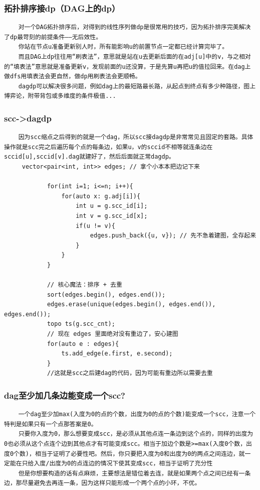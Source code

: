 \documentclass[10pt, a4paper, twocolumn]{article} %
\begin{document}
    \subsubsection{拓扑排序接dp（DAG上的dp）}
    \begin{lstlisting}
    对一个DAG拓扑排序后，对得到的线性序列做dp是很常用的技巧，因为拓扑排序完美解决了dp最苛刻的前提条件——无后效性。
    你站在节点u准备更新别人时，所有能影响u的前置节点一定都已经计算完毕了。
    而且DAG上dp往往用“刷表法”，意思就是站在u去更新后面的在adj[u]中的v，与之相对的“填表法”意思就是准备更新v，发现前面的u还没算，于是先算u再把u的值拉回来。在dag上做dfs用填表法会更自然，做dp用刷表法会更顺畅。
    dagdp可以解决很多问题，例如dag上的最短路最长路，从起点到终点有多少种路径，图上博弈论，附带背包或多维度的条件极值...
    \end{lstlisting}
    \subsubsection{scc->dagdp}
    \begin{lstlisting}
    因为scc缩点之后得到的就是一个dag，所以scc接dagdp是非常常见且固定的套路。具体操作就是scc完之后遍历每个点的每条边，如果u，v的sccid不相等就连条边在sccid[u],sccid[v].dag就建好了，然后后面就正常dagdp。
     vector<pair<int, int>> edges; // 拿个小本本把边记下来
            
            for(int i=1; i<=n; i++){
                for(auto x: g.adj[i]){
                    int u = g.scc_id[i];
                    int v = g.scc_id[x];
                    if(u != v){
                        edges.push_back({u, v}); // 先不急着建图，全存起来
                    }
                }
            }
            
            // 核心魔法：排序 + 去重
            sort(edges.begin(), edges.end());
            edges.erase(unique(edges.begin(), edges.end()), edges.end());
            topo ts(g.scc_cnt);
            // 现在 edges 里面绝对没有重边了，安心建图
            for(auto e : edges){
                ts.add_edge(e.first, e.second);
            }
            //这就是scc之后建dag的代码，因为可能有重边所以需要去重
    \end{lstlisting}
    \subsubsection{dag至少加几条边能变成一个scc?}
    \begin{lstlisting}
    一个dag至少加max(入度为0的点的个数，出度为0的点的个数)能变成一个scc，注意一个特判是如果只有一个点那答案是0。
    只要你入度为0，那么想要变成scc，是必须从其他点连一条边到这个点的，同样的出度为0也必须从这个点连个边到其他点才有可能变成scc。相当于加边个数是>=max(入度0个数，出度0个数)，相当于证明了必要性吧。然后，你只要把入度为0和出度为0的两点之间连边，就一定能在只给入度/出度为0的点连边的情况下使其变成scc，相当于证明了充分性 
    但是你想要构造的话有点麻烦，主要想法是错位着去连，就是如果两个点之间已经有一条边，那尽量避免去再连一条，因为这样只能形成一个两个点的小环，不优。
    \end{lstlisting}
\end{document}
